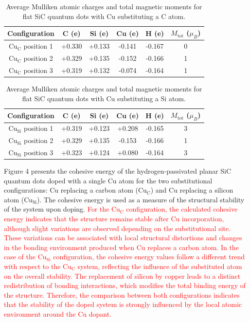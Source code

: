 \documentclass[11pt]{article} %
\begin{document}
\begin{table}[H]
	\centering
	\caption{Average Mulliken atomic charges and total magnetic moments for flat SiC quantum dots with Cu substituting a C atom.}
	\label{tab:mulliken_CuC}
	\begin{tabular}{cccccc}
		\hline
		Configuration & C (e) & Si (e) & Cu (e) & H (e) & $M_{\mathrm{tot}}$ ($\mu_B$) \\
		\hline
		Cu$_{\mathrm{C}}$ position 1 & +0.330 & +0.133 & -0.141 & -0.167 & 0 \\
		Cu$_{\mathrm{C}}$ position 2 & +0.329 & +0.135 & -0.152 & -0.166 & 1 \\
		Cu$_{\mathrm{C}}$ position 3 & +0.319 & +0.132 & -0.074 & -0.164 & 1 \\
		\hline
	\end{tabular}
\end{table}

\begin{table}[H]
	\centering
	\caption{Average Mulliken atomic charges and total magnetic moments for flat SiC quantum dots with Cu substituting a Si atom.}
	\label{tab:mulliken_CuSi}
	\begin{tabular}{cccccc}
		\hline
		Configuration & C (e) & Si (e) & Cu (e) & H (e) & $M_{\mathrm{tot}}$ ($\mu_B$) \\
		\hline
		Cu$_{\mathrm{Si}}$ position 1 & +0.319 & +0.123 & +0.208 & -0.165 & 3 \\
		Cu$_{\mathrm{Si}}$ position 2 & +0.329 & +0.135 & -0.153 & -0.166 & 1 \\
		Cu$_{\mathrm{Si}}$ position 3 & +0.323 & +0.124 & +0.080 & -0.164 & 3 \\
		\hline
	\end{tabular}
\end{table}



Figure 4 presents the cohesive energy of the hydrogen-passivated planar SiC quantum dots doped with a single Cu atom for the two substitutional configurations: Cu replacing a carbon atom ($\mathrm{Cu_{C}}$) and Cu replacing a silicon atom ($\mathrm{Cu_{Si}}$). The cohesive energy is used as a measure of the structural stability of the system upon doping.
\textcolor{red}{For the $\mathrm{Cu_C}$ configuration, the calculated cohesive energy indicates that the structure remains stable after Cu incorporation, although slight variations are observed depending on the substitutional site. These variations can be associated with local structural distortions and changes in the bonding environment produced when Cu replaces a carbon atom. In the case of the $\mathrm{Cu_{Si}}$ configuration, the cohesive energy values follow a different trend with respect to the $\mathrm{Cu_C}$ system, reflecting the influence of the substituted atom on the overall stability. The replacement of silicon by copper leads to a distinct redistribution of bonding interactions, which modifies the total binding energy of the structure. Therefore, the comparison between both configurations indicates that the stability of the doped system is strongly influenced by the local atomic environment around the Cu dopant.}
\end{document}
